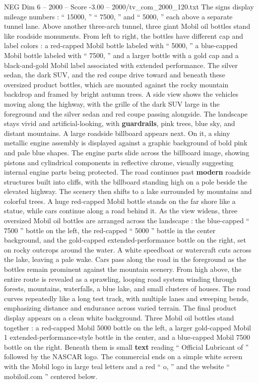 \begin{textsample}{NEG Dim 6 – 2000 – Score -3.00 – 2000/tv\_com\_2000\_120.txt}
The signs display mileage numbers : “ 15000, ” “ 7500, ” and “ 5000, ” each above a separate tunnel lane.
Above another three-arch tunnel, three giant Mobil oil bottles stand like roadside monuments.
From left to right, the bottles have different cap and label colors : a red-capped Mobil bottle labeled with “ 5000, ” a blue-capped Mobil bottle labeled with “ 7500, ” and a larger bottle with a gold cap and a black-and-gold Mobil label associated with extended performance.
The silver sedan, the dark SUV, and the red coupe drive toward and beneath these oversized product bottles, which are mounted against the rocky mountain backdrop and framed by bright autumn trees.
A side view shows the vehicles moving along the highway, with the grille of the dark SUV large in the foreground and the silver sedan and red coupe passing alongside.
The landscape stays vivid and artificial-looking, with \textbf{guardrails}, pink trees, blue sky, and distant mountains.
A large roadside billboard appears next.
On it, a shiny metallic engine assembly is displayed against a graphic background of bold pink and pale blue shapes.
The engine parts slide across the billboard image, showing pistons and cylindrical components in reflective chrome, visually suggesting internal engine parts being protected.
The road continues past \textbf{modern} roadside structures built into cliffs, with the billboard standing high on a pole beside the elevated highway.
The scenery then shifts to a lake surrounded by mountains and colorful trees.
A huge red-capped Mobil bottle stands on the far shore like a statue, while cars continue along a road behind it.
As the view widens, three oversized Mobil oil bottles are arranged across the landscape : the blue-capped “ 7500 ” bottle on the left, the red-capped “ 5000 ” bottle in the center background, and the gold-capped extended-performance bottle on the right, set on rocky outcrops around the water.
A white speedboat or watercraft cuts across the lake, leaving a pale wake.
Cars pass along the road in the foreground as the bottles remain prominent against the mountain scenery.
From high above, the entire route is revealed as a sprawling, looping road system winding through forests, mountains, waterfalls, a blue lake, and small clusters of houses.
The road curves repeatedly like a long test track, with multiple lanes and sweeping bends, emphasizing distance and endurance across varied terrain.
The final product display appears on a clean white background.
Three Mobil oil bottles stand together : a red-capped Mobil 5000 bottle on the left, a larger gold-capped Mobil 1 extended-performance-style bottle in the center, and a blue-capped Mobil 7500 bottle on the right.
Beneath them is small \textbf{text} reading “ Official Lubricant of ” followed by the NASCAR logo.
The commercial ends on a simple white screen with the Mobil logo in large teal letters and a red “ o, ” and the website “ mobiloil.com ” centered below.

\end{textsample}
